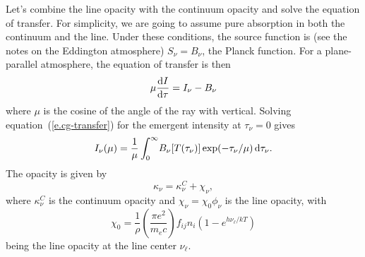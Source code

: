 Let's combine the line opacity with the continuum opacity and solve the equation of transfer.
For simplicity, we are going to assume pure absorption in both the continuum and the line.  Under these conditions, the source function is (see the notes on the Eddington atmosphere) $S_{\nu} = B_{\nu}$, the Planck function. For a plane-parallel atmosphere, the equation of transfer is then
\begin{equation}\label{e.cg-transfer}
\mu\frac{\mathrm{d} I}{\mathrm{d}\tau} = I_{\nu} - B_{\nu}
\end{equation}
where $\mu$ is the cosine of the angle of the ray with vertical. Solving equation~(\ref{e.cg-transfer}) for the emergent intensity at $\tau_{\nu} = 0$ gives
\begin{equation}\label{e.intensity}
I_{\nu}(\mu) = \frac{1}{\mu}\int_{0}^{\infty}\!B_{\nu}[T(\tau_{\nu})] \exp(-\tau_{\nu}/\mu) \,\mathrm{d}\tau_{\nu}.
\end{equation}
The opacity is given by
\begin{equation}\label{e.total-opacity}
\kappa_{\nu} = \kappa_{\nu}^{C} + \chi_{\nu},
\end{equation}
where $\kappa_{\nu}^{C}$ is the continuum opacity and $\chi_{\nu} = \chi_{0}\phi_{\nu}$ is the line opacity, with 
\[
\chi_{0} = \frac{1}{\rho}\left(\frac{\pi e^{2}}{m_{e}c}\right)f_{ij}n_{i}\left(1 - e^{h\nu_{\ell}/kT}\right)
\]
being the line opacity at the line center $\nu_{\ell}$. 

